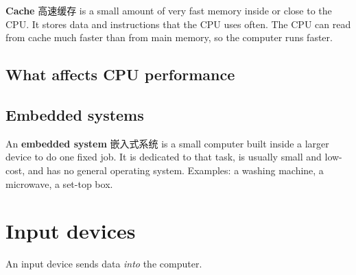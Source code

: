 \documentclass[11pt]{article}
\begin{document}
\textbf{Cache} 高速缓存 is a small amount of very fast memory inside or close to the CPU. It stores data and instructions that the CPU uses often. The CPU can read from cache much faster than from main memory, so the computer runs faster.

\subsection*{What affects CPU performance}

\begin{center}
\end{center}

\subsection*{Embedded systems}

An \textbf{embedded system} 嵌入式系统 is a small computer built inside a larger device to do one fixed job. It is dedicated to that task, is usually small and low-cost, and has no general operating system. Examples: a washing machine, a microwave, a set-top box.

\section*{Input devices}

An input device sends data \emph{into} the computer.
\end{document}
